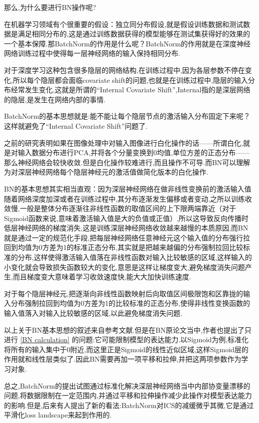 那么,为什么要进行BN操作呢?

在机器学习领域有个很重要的假设：独立同分布假设,就是假设训练数据和测试数据是满足相同分布的,这是通过训练数据获得的模型能够在测试集获得好的效果的一个基本保障.那BatchNorm的作用是什么呢？BatchNorm的作用就是在深度神经网络训练过程中使得每一层神经网络的输入保持相同分布.

对于深度学习这种包含很多隐层的网络结构,在训练过程中,因为各层参数不停在变化,所以每个隐层都会面临covariate shift的问题,也就是在训练过程中,隐层的输入分布经常发生变化,这就是所谓的“Internal Covariate Shift”,Internal指的是深层网络的隐层,是发生在网络内部的事情.

BatchNorm的基本思想就是:能不能让每个隐层节点的激活输入分布固定下来呢？这样就避免了“Internal Covariate Shift”问题了.

之前的研究表明如果在图像处理中对输入图像进行白化操作的话——所谓白化,就是对输入数据分布进行PCA,并将各个分量变换到0均值,单位方差的正态分布——那么神经网络会较快收敛.但是白化操作较难进行,而且操作不可导.而BN可以理解为对深层神经网络每个隐层神经元的激活值做简化版本的白化操作.

BN的基本思想其实相当直观：因为深层神经网络在做非线性变换前的激活输入值随着网络深度加深或者在训练过程中,其分布逐渐发生偏移或者变动,之所以训练收敛慢,一般是整体分布逐渐往非线性函数的取值区间的上下限两端靠近（对于Sigmoid函数来说,意味着激活输入值是大的负值或正值）,所以这导致反向传播时低层神经网络的梯度消失,这是训练深层神经网络收敛越来越慢的本质原因,而BN就是通过一定的规范化手段,把每层神经网络任意神经元这个输入值的分布强行拉回到均值为0方差为1的标准正态分布,其实就是把越来越偏的分布强制拉回比较标准的分布,这样使得激活输入值落在非线性函数对输入比较敏感的区域,这样输入的小变化就会导致损失函数较大的变化,意思是这样让梯度变大,避免梯度消失问题产生,而且梯度变大意味着学习收敛速度快,能大大加快训练速度.

对于每个隐层神经元,把逐渐向非线性函数映射后向取值区间极限饱和区靠拢的输入分布强制拉回到均值为0方差为1的比较标准的正态分布,使得非线性变换函数的输入值落入对输入比较敏感的区域,以此避免梯度消失问题.

以上关于BN基本思想的叙述来自参考文献\cite{BN}.但是在BN原论文\cite{BNpaper}当中,作者也提出了只进行 \ref{BN calculation} 的问题:它可能限制模型的表达能力.以Sigmoid为例,标准化将所有的输入集中于$0$附近,而这里正是Sigmoid的线性近似区域,这样Sigmoid层的作用就和线性层类似了.因此BN需要再加一项平移和拉伸,并把这两项参数作为学习对象.

总之,BatchNorm的提出试图通过标准化解决深层神经网络当中内部协变量漂移的问题,将数据限制在一定范围内,并通过平移和拉伸操作减少此操作对模型表达能力的影响.但是,后来有人提出了新的看法:BatchNorm对ICS的减缓微乎其微,它是通过平滑化loss landscape来起到作用的.

